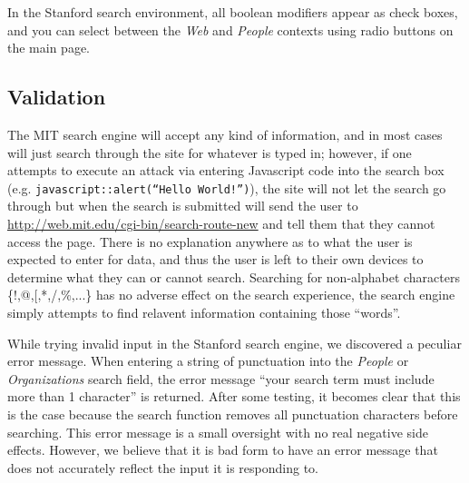             In the Stanford search environment, all boolean modifiers appear as check
            boxes, and you can select between the \textsl{Web} and \textsl{People}
            contexts using radio buttons on the main page.

\subsection*{Validation}

            The MIT search engine will accept any kind of information, and in most cases will just
            search through the site for whatever is typed in; however, if one attempts to execute an
            attack via entering Javascript code into the search box (e.g. \texttt{javascript::alert(``Hello World!'')}),
            the site will not let the search go through but when the search is submitted will send
            the user to \url{http://web.mit.edu/cgi-bin/search-route-new} and tell them that they
            cannot access the page. There is no explanation anywhere as to what the user is expected to
            enter for data, and thus the user is left to their own devices to determine what they can or
            cannot search. Searching for non-alphabet characters \{!,@,[,*,/,\%,...\} has no adverse effect on
            the search experience, the search engine simply attempts to find relavent information containing
            those ``words''.

            While trying invalid input in the Stanford search engine, we discovered
            a peculiar error message. When entering a string of punctuation into
            the \textsl{People} or \textsl{Organizations} search field, the
            error message ``your search term must include more than 1 character''
            is returned. After some testing, it becomes clear that this is the case
            because the search function removes all punctuation characters before
            searching. This error message is a small oversight with no real
            negative side effects. However, we believe that it is bad form
            to have an error message that does not accurately reflect the input
            it is responding to.

